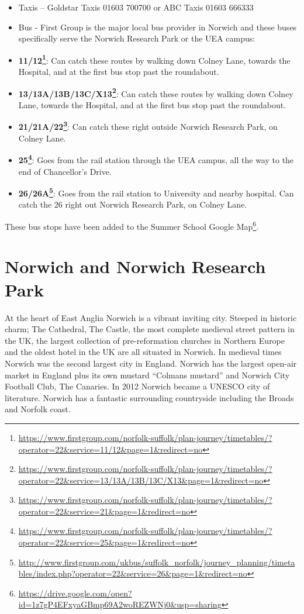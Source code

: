 \documentclass[12pt,]{book}
\providecommand{\tightlist}{%
  \setlength{\itemsep}{0pt}\setlength{\parskip}{0pt}}
\let\rmarkdownfootnote\footnote%
\def\footnote{\protect\rmarkdownfootnote}
\renewcommand{\href}[2]{#2\footnote{\url{#1}}}
\begin{document}
\begin{itemize}
\tightlist
\item
  Taxis -- Goldstar Taxis 01603 700700 or ABC Taxis 01603 666333
\item
  Bus - First Group is the major local bus provider in Norwich and these
  buses specifically serve the Norwich Research Park or the UEA campus:
\item
  \textbf{\href{https://www.firstgroup.com/norfolk-suffolk/plan-journey/timetables/?operator=22\&service=11/12\&page=1\&redirect=no}{11/12}}:
  Can catch these routes by walking down Colney Lane, towards the
  Hospital, and at the first bus stop past the roundabout.
\item
  \textbf{\href{https://www.firstgroup.com/norfolk-suffolk/plan-journey/timetables/?operator=22\&service=13/13A/13B/13C/X13\&page=1\&redirect=no}{13/13A/13B/13C/X13}}:
  Can catch these routes by walking down Colney Lane, towards the
  Hospital, and at the first bus stop past the roundabout.
\item
  \textbf{\href{https://www.firstgroup.com/norfolk-suffolk/plan-journey/timetables/?operator=22\&service=21\&page=1\&redirect=no}{21/21A/22}}:
  Can catch these right outside Norwich Research Park, on Colney Lane.
\item
  \textbf{\href{https://www.firstgroup.com/norfolk-suffolk/plan-journey/timetables/?operator=22\&service=25\&page=1\&redirect=no}{25}}:
  Goes from the rail station through the UEA campus, all the way to the
  end of Chancellor's Drive.
\item
  \textbf{\href{http://www.firstgroup.com/ukbus/suffolk_norfolk/journey_planning/timetables/index.php?operator=22\&service=26\&page=1\&redirect=no}{26/26A}}:
  Goes from the rail station to University and nearby hospital. Can
  catch the 26 right out Norwich Research Park, on Colney Lane.
\end{itemize}

These bus stops have been added to the
\href{https://drive.google.com/open?id=1z7gP4EFxyaGBmp69A2woREZWNj0\&usp=sharing}{Summer
School Google Map}.

\section*{Norwich and Norwich Research
Park}\label{norwich-and-norwich-research-park}

At the heart of East Anglia Norwich is a vibrant inviting city. Steeped
in historic charm; The Cathedral, The Castle, the most complete medieval
street pattern in the UK, the largest collection of pre-reformation
churches in Northern Europe and the oldest hotel in the UK are all
situated in Norwich. In medieval times Norwich was the second largest
city in England. Norwich has the largest open-air market in England plus
its own mustard ``Colmans mustard'' and Norwich City Football Club, The
Canaries. In 2012 Norwich became a UNESCO city of literature. Norwich
has a fantastic surrounding countryside including the Broads and Norfolk
coast.
\end{document}
